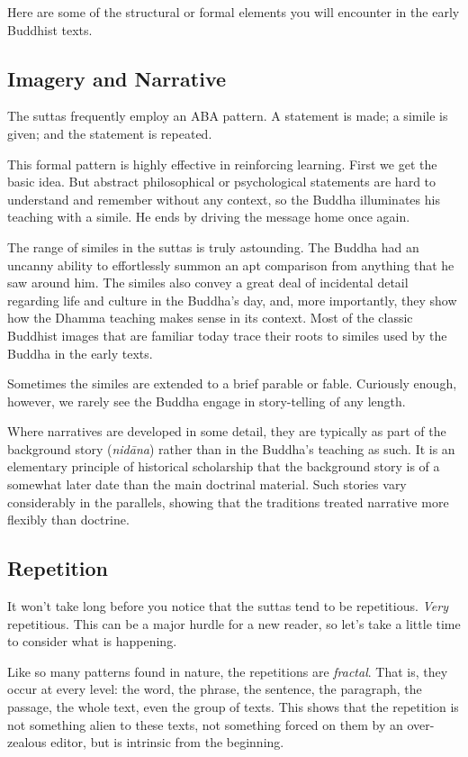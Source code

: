 \documentclass[12pt,openany]{book}%
\begin{document}
Here are some of the structural or formal elements you will encounter in the early Buddhist texts.

\subsection*{Imagery and Narrative}

The suttas frequently employ an ABA pattern. A statement is made; a simile is given; and the statement is repeated.

This formal pattern is highly effective in reinforcing learning. First we get the basic idea. But abstract philosophical or psychological statements are hard to understand and remember without any context, so the Buddha illuminates his teaching with a simile. He ends by driving the message home once again.

The range of similes in the suttas is truly astounding. The Buddha had an uncanny ability to effortlessly summon an apt comparison from anything that he saw around him. The similes also convey a great deal of incidental detail regarding life and culture in the Buddha’s day, and, more importantly, they show how the Dhamma teaching makes sense in its context. Most of the classic Buddhist images that are familiar today trace their roots to similes used by the Buddha in the early texts.

Sometimes the similes are extended to a brief parable or fable. Curiously enough, however, we rarely see the Buddha engage in story-telling of any length.

Where narratives are developed in some detail, they are typically as part of the background story (\textit{\textsanskrit{nidāna}}) rather than in the Buddha’s teaching as such. It is an elementary principle of historical scholarship that the background story is of a somewhat later date than the main doctrinal material. Such stories vary considerably in the parallels, showing that the traditions treated narrative more flexibly than doctrine.

\subsection*{Repetition}

It won’t take long before you notice that the suttas tend to be repetitious. \emph{Very} repetitious. This can be a major hurdle for a new reader, so let’s take a little time to consider what is happening.

Like so many patterns found in nature, the repetitions are \emph{fractal}. That is, they occur at every level: the word, the phrase, the sentence, the paragraph, the passage, the whole text, even the group of texts. This shows that the repetition is not something alien to these texts, not something forced on them by an over-zealous editor, but is intrinsic from the beginning.
\end{document}
